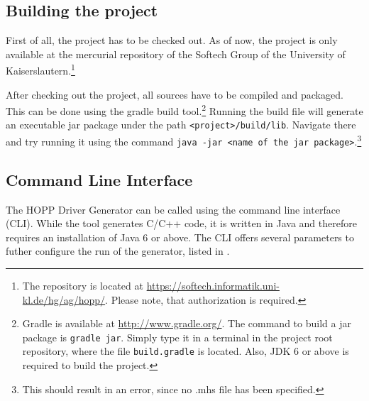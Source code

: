 \documentclass{report}
\begin{document}
\subsection{Building the project}
First of all, the project has to be checked out. As of now, the project is only available at the mercurial repository of the Softech Group of the University of Kaiserslautern.\footnote{The repository is located at \url{https://softech.informatik.uni-kl.de/hg/ag/hopp/}. Please note, that authorization is required.}

After checking out the project, all sources have to be compiled and packaged. This can be done using the gradle build tool.\footnote{Gradle is available at \url{http://www.gradle.org/}. The command to build a jar package is \texttt{gradle jar}. Simply type it in a terminal in the project root repository, where the file \texttt{build.gradle} is located. Also, JDK 6 or above is required to build the project.} Running the build file will generate an executable jar package under the path \texttt{<project>/build/lib}. Navigate there and try running it using the command \texttt{java -jar <name of the jar package>}.\footnote{This should result in an error, since no .mhs file has been specified.} 

\subsection{Command Line Interface}
The HOPP Driver Generator can be called using the command line interface (CLI). While the tool generates C/C++ code, it is written in Java and therefore requires an installation of Java 6 or above. The CLI offers several parameters to futher configure the run of the generator, listed in .
\end{document}
